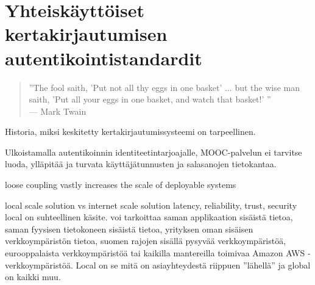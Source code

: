 \documentclass[finnish,gradu]{tktltiki}
\begin{document}




\section{Yhteiskäyttöiset kertakirjautumisen autentikointistandardit} %
\label{sec:Kertakirjautumisstandardit}
  \begin{quote}
      ''The fool saith, 'Put not all thy eggs in one basket' ...
      but the wise man saith, 'Put all your eggs in one basket, and watch that basket!' ''
      \\--- Mark Twain~\cite{twain_eggs_1894}
  \end{quote}

  Historia, miksi keskitetty kertakirjautumissysteemi on tarpeellinen.

  Ulkoistamalla autentikoinnin identiteetintarjoajalle, MOOC-palvelun ei tarvitse luoda, ylläpitää ja turvata käyttäjätunnusten ja salasanojen tietokantaa.

  loose coupling vastly increases the scale of deployable systems

  local scale solution vs internet scale solution
  latency, reliability, trust, security
  local on suhteellinen käsite. voi tarkoittaa saman applikaation sisäistä tietoa, saman fyysisen tietokoneen sisäistä tietoa, yrityksen oman sisäisen verkkoympäristön tietoa, suomen rajojen sisällä pysyvää verkkoympäristöä, eurooppalaista verkkoympäristöä tai kaikilla mantereilla toimivaa Amazon AWS -verkkoympäristöä. Local on se mitä on asiayhteydestä riippuen ''lähellä'' ja global on kaikki muu.
\end{document}
